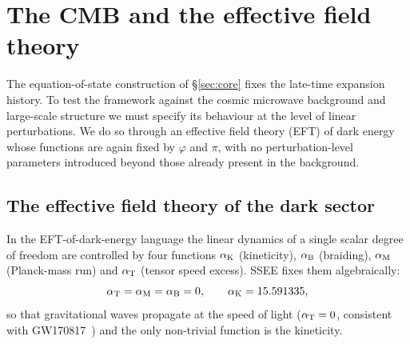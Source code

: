 \documentclass[a4paper,11pt]{article}
\begin{document}
\section{The CMB and the effective field theory}
\label{sec:eft}

The equation-of-state construction of \S\ref{sec:core} fixes the
late-time expansion history. To test the framework against the cosmic
microwave background and large-scale structure we must specify its behaviour
at the level of linear perturbations. We do so through an effective field
theory (EFT) of dark energy whose functions are again fixed by $\varphi$ and
$\pi$, with no perturbation-level parameters introduced beyond those already
present in the background.

\subsection{The effective field theory of the dark sector}
\label{sec:eft-functions}
In the EFT-of-dark-energy language \citep{Cheung2008,Gubitosi2013,Bellini2014} the linear
dynamics of a single scalar degree of freedom are controlled by four
functions $\alpha_{\rm K}$ (kineticity), $\alpha_{\rm B}$ (braiding),
$\alpha_{\rm M}$ (Planck-mass run) and $\alpha_{\rm T}$ (tensor speed excess).
SSEE fixes them algebraically:
\begin{equation}
  \label{eq:eft-alphas}
  \alpha_{\rm T}=\alpha_{\rm M}=\alpha_{\rm B}=0,
  \qquad
  \alpha_{\rm K}=15.591335 ,
\end{equation}
so that gravitational waves propagate at the speed of light
($\alpha_{\rm T}=0$, consistent with GW170817~\citep{GW170817}) and the only
non-trivial function is the kineticity.
\end{document}
